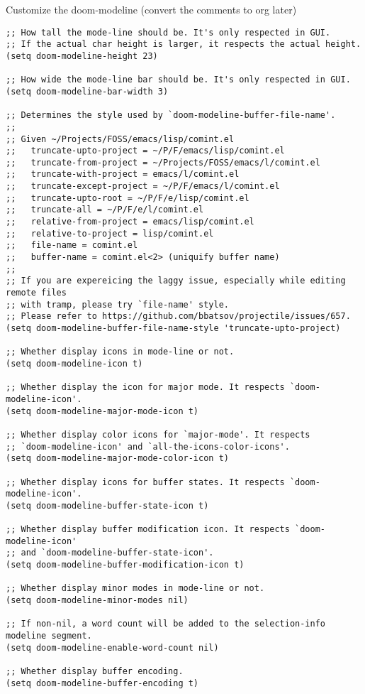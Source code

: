 \documentclass[11pt]{article}
\begin{document}
Customize the doom-modeline (convert the comments to org later)
\begin{verbatim}
;; How tall the mode-line should be. It's only respected in GUI.
;; If the actual char height is larger, it respects the actual height.
(setq doom-modeline-height 23)

;; How wide the mode-line bar should be. It's only respected in GUI.
(setq doom-modeline-bar-width 3)

;; Determines the style used by `doom-modeline-buffer-file-name'.
;;
;; Given ~/Projects/FOSS/emacs/lisp/comint.el
;;   truncate-upto-project = ~/P/F/emacs/lisp/comint.el
;;   truncate-from-project = ~/Projects/FOSS/emacs/l/comint.el
;;   truncate-with-project = emacs/l/comint.el
;;   truncate-except-project = ~/P/F/emacs/l/comint.el
;;   truncate-upto-root = ~/P/F/e/lisp/comint.el
;;   truncate-all = ~/P/F/e/l/comint.el
;;   relative-from-project = emacs/lisp/comint.el
;;   relative-to-project = lisp/comint.el
;;   file-name = comint.el
;;   buffer-name = comint.el<2> (uniquify buffer name)
;;
;; If you are expereicing the laggy issue, especially while editing remote files
;; with tramp, please try `file-name' style.
;; Please refer to https://github.com/bbatsov/projectile/issues/657.
(setq doom-modeline-buffer-file-name-style 'truncate-upto-project)

;; Whether display icons in mode-line or not.
(setq doom-modeline-icon t)

;; Whether display the icon for major mode. It respects `doom-modeline-icon'.
(setq doom-modeline-major-mode-icon t)

;; Whether display color icons for `major-mode'. It respects
;; `doom-modeline-icon' and `all-the-icons-color-icons'.
(setq doom-modeline-major-mode-color-icon t)

;; Whether display icons for buffer states. It respects `doom-modeline-icon'.
(setq doom-modeline-buffer-state-icon t)

;; Whether display buffer modification icon. It respects `doom-modeline-icon'
;; and `doom-modeline-buffer-state-icon'.
(setq doom-modeline-buffer-modification-icon t)

;; Whether display minor modes in mode-line or not.
(setq doom-modeline-minor-modes nil)

;; If non-nil, a word count will be added to the selection-info modeline segment.
(setq doom-modeline-enable-word-count nil)

;; Whether display buffer encoding.
(setq doom-modeline-buffer-encoding t)


\end{verbatim}
\end{document}

